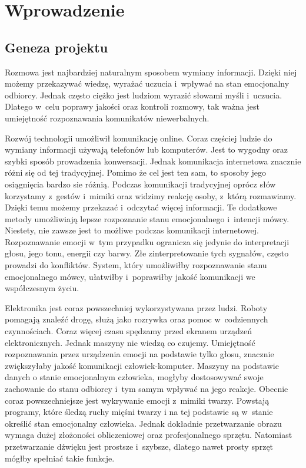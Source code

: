 \documentclass[declaration,shortabstract]{iithesis}
\author         {Elżbieta Plaszczyk}
\begin{document}
\let\cleardoublepage\clearpage
\chapter{Wprowadzenie}
\section{Geneza projektu}
Rozmowa jest najbardziej naturalnym sposobem wymiany informacji. Dzięki niej możemy przekazywać wiedzę, wyrażać uczucia i~wpływać na stan emocjonalny odbiorcy.  Jednak często ciężko jest ludziom wyrazić słowami myśli i~uczucia. Dlatego w~celu poprawy jakości oraz kontroli rozmowy, tak ważna jest umiejętność rozpoznawania komunikatów niewerbalnych. 

Rozwój technologii umożliwił komunikację online. Coraz częściej ludzie do wymiany informacji używają telefonów lub komputerów. Jest to wygodny oraz szybki sposób prowadzenia konwersacji. Jednak komunikacja internetowa znacznie różni się od tej tradycyjnej. Pomimo że cel jest ten sam, to sposoby jego osiągnięcia bardzo sie różnią. Podczas komunikacji tradycyjnej oprócz słów korzystamy z~gestów i~mimiki oraz widzimy reakcję osoby, z~którą rozmawiamy. Dzięki temu możemy przekazać i~odczytać więcej informacji. Te dodatkowe metody umożliwiają lepsze rozpoznanie stanu emocjonalnego i~intencji mówcy. Niestety, nie zawsze jest to możliwe podczas komunikacji internetowej. Rozpoznawanie emocji w~tym przypadku ogranicza się jedynie do interpretacji głosu, jego tonu, energii czy barwy. Złe zinterpretowanie tych sygnałów, często prowadzi do konfliktów. System, który umożliwiłby rozpoznawanie stanu emocjonalnego mówcy, ułatwiłby i~poprawiłby jakość komunikacji we współczesnym życiu. 

Elektronika jest coraz powszechniej wykorzystywana przez ludzi. Roboty pomagają znaleźć drogę, służą jako rozrywka oraz pomoc w~codziennych czynnościach. Coraz więcej czasu spędzamy przed ekranem urządzeń elektronicznych. Jednak maszyny nie wiedzą co czujemy. Umiejętność rozpoznawania przez urządzenia emocji na podstawie tylko głosu, znacznie zwiększyłaby jakość komunikacji człowiek-komputer. Maszyny na podstawie danych o stanie emocjonalnym człowieka, mogłyby dostosowywać swoje zachowanie do stanu odbiorcy i~tym samym wpływać na jego reakcje. Obecnie coraz powszechniejsze jest wykrywanie emocji z~mimiki twarzy. Powstają programy, które śledzą ruchy mięśni twarzy i na tej podstawie są w~stanie określić stan emocjonalny człowieka. Jednak dokładnie przetwarzanie obrazu wymaga dużej złożoności obliczeniowej oraz profesjonalnego sprzętu. Natomiast przetwarzanie dźwięku jest prostsze i~szybsze, dlatego nawet prosty sprzęt mógłby spełniać takie funkcje.
\end{document}
